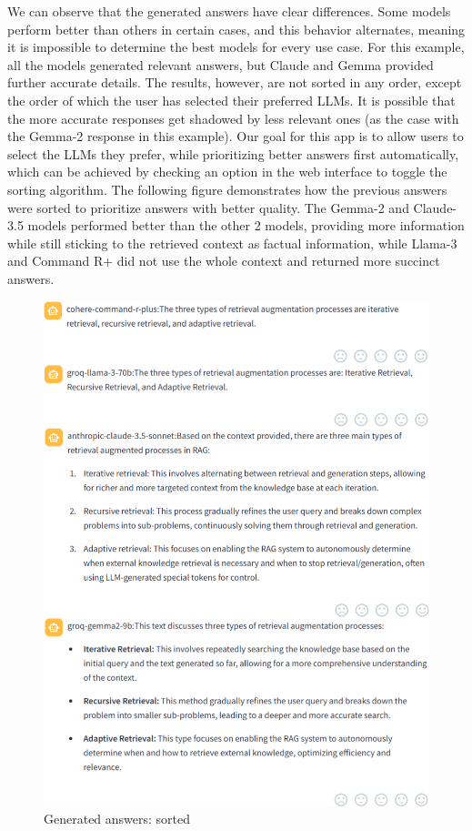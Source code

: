 \newpage
We can observe that the generated answers have clear differences. Some models perform better than others in certain cases, and this behavior alternates, meaning it is impossible to determine the best models for every use case. For this example, all the models generated relevant answers, but Claude and Gemma provided further accurate details. The results, however, are not sorted in any order, except the order of which the user has selected their preferred LLMs. It is possible that the more accurate responses get shadowed by less relevant ones (as the case with the Gemma-2 response in this example). Our goal for this app is to allow users to select the LLMs they prefer, while prioritizing better answers first automatically, which can be achieved by checking an option in the web interface to toggle the sorting algorithm.\newline
The following figure demonstrates how the previous answers were sorted to prioritize answers with better quality.\newline
The Gemma-2 and Claude-3.5 models performed better than the other 2 models, providing more information while still sticking to the retrieved context as factual information, while Llama-3 and Command R+ did not use the whole context and returned more succinct answers.\newline
\begin{figure}[htbp]
    \centering
    \includegraphics[width=\linewidth]{./figures/app-answers-sorted.png}
    \caption{Generated answers: sorted}
\end{figure}